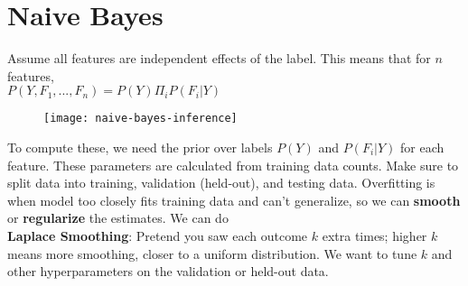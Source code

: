 \section{Naive Bayes}
Assume all features are independent effects of the label. This means that for $n$ features, \\
$P(Y,F_1,...,F_n)=P(Y)\Pi_{i}P(F_{i}|Y)$ \\
\begin{figure}[H]
\centering
\texttt{[image: naive-bayes-inference]}
\end{figure}
To compute these, we need the prior over labels $P(Y)$ and $P(F_{i}|Y)$ for each feature. These parameters are calculated from training data counts. Make sure to split data into training, validation (held-out), and testing data. Overfitting is when model too closely fits training data and can't generalize, so we can \textbf{smooth} or \textbf{regularize} the estimates. We can do \\
\textbf{Laplace Smoothing}: Pretend you saw each outcome $k$ extra times; higher $k$ means more smoothing, closer to a uniform distribution. We want to tune $k$ and other hyperparameters on the validation or held-out data.